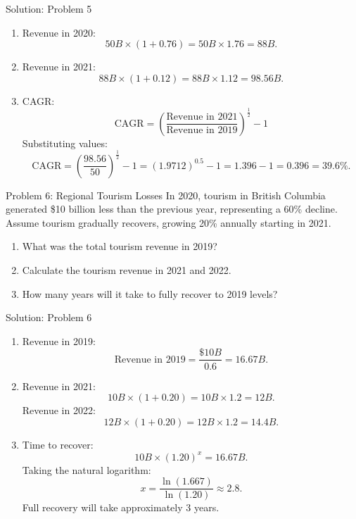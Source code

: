 \documentclass{beamer}
\begin{document}
\begin{frame}{Solution: Problem 5}
\begin{enumerate}
    \item Revenue in 2020:
    \[
    50B \times (1 + 0.76) = 50B \times 1.76 = 88B.
    \]
    \item Revenue in 2021:
    \[
    88B \times (1 + 0.12) = 88B \times 1.12 = 98.56B.
    \]
    \item CAGR:
    \[
    \text{CAGR} = \left(\frac{\text{Revenue in 2021}}{\text{Revenue in 2019}}\right)^{\frac{1}{2}} - 1
    \]
    Substituting values:
    \[
    \text{CAGR} = \left(\frac{98.56}{50}\right)^{\frac{1}{2}} - 1 = (1.9712)^{0.5} - 1 = 1.396 - 1 = 0.396 = 39.6\%.
    \]
\end{enumerate}
\end{frame}

\begin{frame}{Problem 6: Regional Tourism Losses}
In 2020, tourism in British Columbia generated \$10 billion less than the previous year, representing a 60\% decline. Assume tourism gradually recovers, growing 20\% annually starting in 2021.

\begin{enumerate}
    \item What was the total tourism revenue in 2019?
    \item Calculate the tourism revenue in 2021 and 2022.
    \item How many years will it take to fully recover to 2019 levels?
\end{enumerate}
\end{frame}

\begin{frame}{Solution: Problem 6}
\begin{enumerate}
    \item Revenue in 2019:
    \[
    \text{Revenue in 2019} = \frac{\$10B}{0.6} = 16.67B.
    \]
    \item Revenue in 2021:
    \[
    10B \times (1 + 0.20) = 10B \times 1.2 = 12B.
    \]
    Revenue in 2022:
    \[
    12B \times (1 + 0.20) = 12B \times 1.2 = 14.4B.
    \]
    \item Time to recover:
    \[
    10B \times (1.20)^x = 16.67B.
    \]
    Taking the natural logarithm:
    \[
    x = \frac{\ln(1.667)}{\ln(1.20)} \approx 2.8.
    \]
    Full recovery will take approximately 3 years.
\end{enumerate}
\end{frame}
\end{document}
